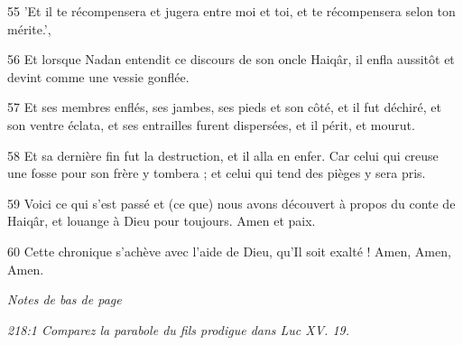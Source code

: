 \par 55 'Et il te récompensera et jugera entre moi et toi, et te récompensera selon ton mérite.',

\par 56 Et lorsque Nadan entendit ce discours de son oncle Haiqâr, il enfla aussitôt et devint comme une vessie gonflée.

\par 57 Et ses membres enflés, ses jambes, ses pieds et son côté, et il fut déchiré, et son ventre éclata, et ses entrailles furent dispersées, et il périt, et mourut.

\par 58 Et sa dernière fin fut la destruction, et il alla en enfer. Car celui qui creuse une fosse pour son frère y tombera ; et celui qui tend des pièges y sera pris.

\par 59 Voici ce qui s'est passé et (ce que) nous avons découvert à propos du conte de Haiqâr, et louange à Dieu pour toujours. Amen et paix.

\par 60 Cette chronique s'achève avec l'aide de Dieu, qu'Il soit exalté ! Amen, Amen, Amen.

\par \textit{Notes de bas de page}

\par \textit{218:1 Comparez la parabole du fils prodigue dans Luc XV. 19.}



